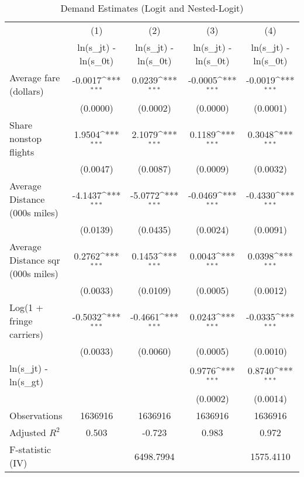 \begin{table}[htbp]\centering
\def\sym#1{\ifmmode^{#1}\else\(^{#1}\)\fi}
\caption{Demand Estimates (Logit and Nested-Logit)}
\begin{tabular}{l*{4}{c}}
\toprule
                    &\multicolumn{1}{c}{(1)}&\multicolumn{1}{c}{(2)}&\multicolumn{1}{c}{(3)}&\multicolumn{1}{c}{(4)}\\
                    &\multicolumn{1}{c}{ln(s\_jt) - ln(s\_0t)}&\multicolumn{1}{c}{ln(s\_jt) - ln(s\_0t)}&\multicolumn{1}{c}{ln(s\_jt) - ln(s\_0t)}&\multicolumn{1}{c}{ln(s\_jt) - ln(s\_0t)}\\
\midrule
Average fare (dollars)&     -0.0017\sym{***}&      0.0239\sym{***}&     -0.0005\sym{***}&     -0.0019\sym{***}\\
                    &    (0.0000)         &    (0.0002)         &    (0.0000)         &    (0.0001)         \\
\addlinespace
Share nonstop flights &      1.9504\sym{***}&      2.1079\sym{***}&      0.1189\sym{***}&      0.3048\sym{***}\\
                    &    (0.0047)         &    (0.0087)         &    (0.0009)         &    (0.0032)         \\
\addlinespace
Average Distance (000s miles)&     -4.1437\sym{***}&     -5.0772\sym{***}&     -0.0469\sym{***}&     -0.4330\sym{***}\\
                    &    (0.0139)         &    (0.0435)         &    (0.0024)         &    (0.0091)         \\
\addlinespace
Average Distance sqr (000s miles)&      0.2762\sym{***}&      0.1453\sym{***}&      0.0043\sym{***}&      0.0398\sym{***}\\
                    &    (0.0033)         &    (0.0109)         &    (0.0005)         &    (0.0012)         \\
\addlinespace
Log(1 + fringe carriers)&     -0.5032\sym{***}&     -0.4661\sym{***}&      0.0243\sym{***}&     -0.0335\sym{***}\\
                    &    (0.0033)         &    (0.0060)         &    (0.0005)         &    (0.0010)         \\
\addlinespace
ln(s\_jt) - ln(s\_gt) &                     &                     &      0.9776\sym{***}&      0.8740\sym{***}\\
                    &                     &                     &    (0.0002)         &    (0.0014)         \\
\midrule
Observations        &     1636916         &     1636916         &     1636916         &     1636916         \\
Adjusted \(R^{2}\)  &       0.503         &      -0.723         &       0.983         &       0.972         \\
F-statistic (IV)    &                     &   6498.7994         &                     &   1575.4110         \\
\bottomrule
\end{tabular}
\end{table}
